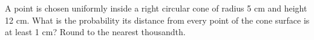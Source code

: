 A point is chosen uniformly inside a right circular cone of radius 5 cm and height 12 cm. What is the probability its distance from every point of the cone surface is at least 1 cm? Round to the nearest thousandth.

